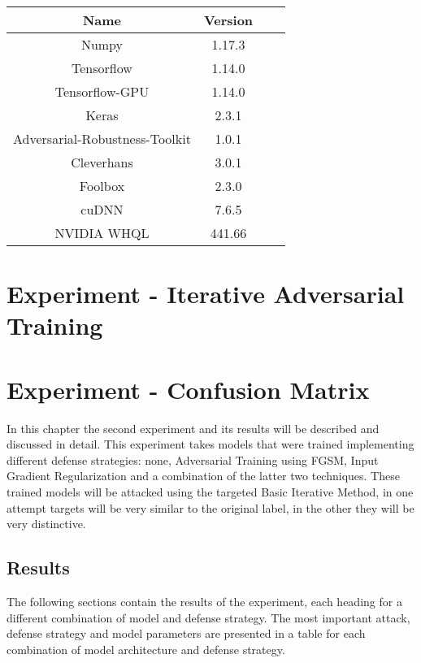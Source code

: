 \documentclass[draft,final]{vutinfth} %
\begin{document}
\begin{table}[h]
  \centering
  \begin{tabular}{cccc}
    \toprule
Name                                    & Version   \\
    \midrule
    Numpy                               & 1.17.3    \\
    Tensorflow                          & 1.14.0    \\
    Tensorflow-GPU                      & 1.14.0    \\
    Keras                               & 2.3.1     \\
    Adversarial-Robustness-Toolkit      & 1.0.1     \\
    Cleverhans                          & 3.0.1     \\
    Foolbox                             & 2.3.0     \\
		cuDNN																&	7.6.5			\\
		NVIDIA WHQL													& 441.66		\\
		
    
    \bottomrule
  \end{tabular}
\end{table}


\chapter{Experiment - Iterative Adversarial Training}

\chapter{Experiment - Confusion Matrix}

In this chapter the second experiment and its results will be described and discussed in detail.
This experiment takes models that were trained implementing different defense strategies: none, Adversarial Training using FGSM, Input Gradient Regularization and a combination of the latter two techniques.
These trained models will be attacked using the targeted Basic Iterative Method, in one attempt targets will be very similar to the original label, in the other they will be very distinctive.


\section{Results}

The following sections contain the results of the experiment, each heading for a different combination of model and defense strategy.
The most important attack, defense strategy and model parameters are presented in a table for each combination of model architecture and defense strategy.
\end{document}
